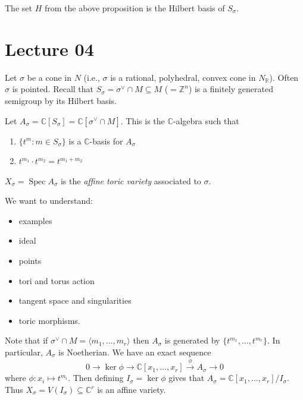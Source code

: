 \documentclass[a4paper,12pt]{amsart}
\newcommand{\CC}{\mathbb{C}}
\DeclareMathOperator{\Spec}{Spec}
\begin{document}
The set $H$ from the above proposition is the Hilbert basis of $S_\sigma$.

\newpage
\section{Lecture 04}

Let $\sigma$ be a cone in $N$ (i.e., $\sigma$ is a rational, polyhedral, convex cone in $N_\mathbb{R}$).
Often $\sigma$ is pointed.
Recall that $S_\sigma = \sigma^\vee \cap M \subseteq M$ ($= \mathbb{Z}^n$) is a finitely generated semigroup by its Hilbert basis.

\begin{Def}
Let $A_\sigma = \CC[S_\sigma] = \CC[\sigma^\vee \cap M]$.
This is the $\CC$-algebra such that
\begin{enumerate}
\item $\{t^m : m \in S_\sigma\}$ is a $\CC$-basis for $A_\sigma$
\item $t^{m_1} \cdot t^{m_2} = t^{m_1 + m_2}$
\end{enumerate}
\end{Def}

\begin{Def}
$X_\sigma = \Spec A_\sigma$ is the \emph{affine toric variety} associated to $\sigma$.
\end{Def}

We want to understand:
\begin{itemize}
\item examples
\item ideal
\item points
\item tori and torus action
\item tangent space and singularities
\item toric morphisms.
\end{itemize}

Note that if $\sigma^\vee \cap M = \langle m_1, \dots, m_r \rangle$ then $A_\sigma$ is generated by $\{t^{m_1}, \dots, t^{m_r}\}$.
In particular, $A_\sigma$ is Noetherian.
We have an exact sequence
\[
0 \to \ker \phi \to \CC[x_1, \dots, x_r] \overset{\phi}{\to} A_\sigma \to 0
\]
where $\phi: x_i \mapsto t^{m_i}$.
Then defining $I_\sigma = \ker \phi$ gives that $A_\sigma = \CC[x_1, \dots, x_r]/I_\sigma$.
Thus $X_\sigma = V(I_\sigma) \subseteq \CC^r$ is an affine variety.
\end{document}
